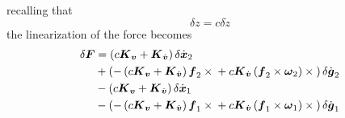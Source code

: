 \documentclass[10pt,dvips,fleqn]{report}
\newcommand{\T}[1]{\boldsymbol{#1}}
\begin{document}
recalling that
\begin{equation}
	\delta{z} = c \delta\dot{z}
\end{equation}
the linearization of the force becomes
\begin{align}
	\delta\T{F} &= \plbr{c\T{K}_{\T{v}} + \T{K}_{\dot{\T{v}}}} \delta\dot{\T{x}}_2
		\nonumber \\
		& + \plbr{
			- \plbr{c\T{K}_{\T{v}} + \T{K}_{\dot{\T{v}}}} \T{f}_2\times{}
			+ c \T{K}_{\dot{\T{v}}} \plbr{\T{f}_2 \times \T{\omega}_2}\times{}
		} \delta\dot{\T{g}}_2
		\nonumber \\
		& - \plbr{c\T{K}_{\T{v}} + \T{K}_{\dot{\T{v}}}} \delta\dot{\T{x}}_1
		\nonumber \\
		& - \plbr{
			- \plbr{c\T{K}_{\T{v}} + \T{K}_{\dot{\T{v}}}} \T{f}_1\times{}
			+ c \T{K}_{\dot{\T{v}}} \plbr{\T{f}_1 \times \T{\omega}_1}\times{}
		} \delta\dot{\T{g}}_1
\end{align}
\end{document}
